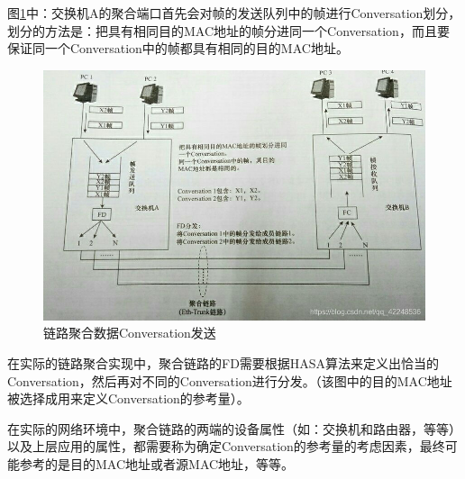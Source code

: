 图\ref{fig:switch_link_aggre_conversation_transmit}中：交换机A的聚合端口首先会对帧的发送队列中的帧进行Conversation划分，
划分的方法是：把具有相同目的MAC地址的帧分进同一个Conversation，而且要保证同一个Conversation中的帧都具有相同的目的MAC地址。
\begin{figure}[ht]
    \centering
    \includegraphics[scale=0.5]{pic/20190414180436629.jpg}
    \caption{链路聚合数据Conversation发送}
    \label{fig:switch_link_aggre_conversation_transmit}
\end{figure}

在实际的链路聚合实现中，聚合链路的FD需要根据HASA算法来定义出恰当的Conversation，然后再对不同的Conversation进行分发。（该图中的目的MAC地址被选择成用来定义Conversation的参考量）。

在实际的网络环境中，聚合链路的两端的设备属性（如：交换机和路由器，等等）以及上层应用的属性，都需要称为确定Conversation的参考量的考虑因素，最终可能参考的是目的MAC地址或者源MAC地址，等等。
